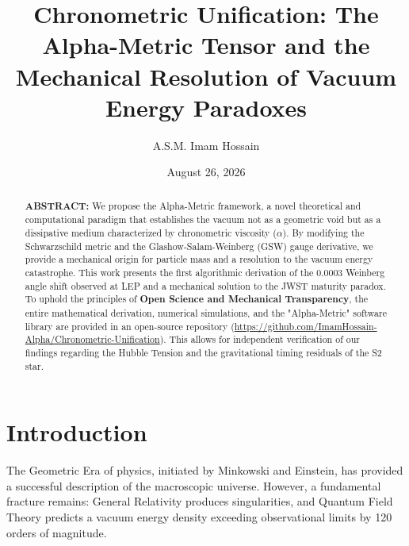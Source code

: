 \documentclass[aps,prresearch,reprint,onecolumn,superscriptaddress,nofootinbib,12pt]{revtex4-2}
\begin{document}
\title{Chronometric Unification: The Alpha-Metric Tensor and the Mechanical Resolution of Vacuum Energy Paradoxes}

\author{A.S.M. Imam Hossain}

\date{August 26, 2026}

\begin{abstract}
\vspace{0.2in} %
\noindent \textbf{ABSTRACT:} We propose the Alpha-Metric framework, a novel theoretical and computational paradigm that establishes the vacuum not as a geometric void but as a dissipative medium characterized by chronometric viscosity ($\alpha$). By modifying the Schwarzschild metric and the Glashow-Salam-Weinberg (GSW) gauge derivative, we provide a mechanical origin for particle mass and a resolution to the vacuum energy catastrophe. This work presents the first algorithmic derivation of the 0.0003 Weinberg angle shift observed at LEP and a mechanical solution to the JWST maturity paradox. To uphold the principles of \textbf{Open Science and Mechanical Transparency}, the entire mathematical derivation, numerical simulations, and the "Alpha-Metric" software library are provided in an open-source repository (\url{https://github.com/ImamHossain-Alpha/Chronometric-Unification}). This allows for independent verification of our findings regarding the Hubble Tension and the gravitational timing residuals of the S2 star.
\end{abstract}

\maketitle

\section{Introduction}
The Geometric Era of physics, initiated by Minkowski and Einstein, has provided a successful description of the macroscopic universe. However, a fundamental fracture remains: General Relativity produces singularities, and Quantum Field Theory predicts a vacuum energy density exceeding observational limits by 120 orders of magnitude. 
\end{document}
